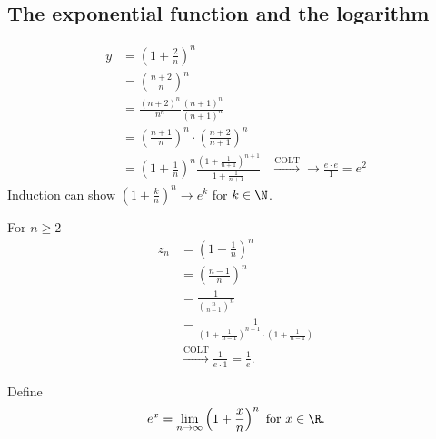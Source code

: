 \documentclass[10pt, a4paper]{article}
\begin{document}
\subsection{The exponential function and the logarithm}
\begin{example}
    \begin{align*}
        y &= \left(1 + \frac{2}{n}\right) ^ n \\
        &= \left(\frac{n + 2}{n}\right) ^ n \\
        &= \frac{(n + 2) ^ n}{n ^ n}\frac{(n + 1) ^ n}{(n + 1) ^ n} \\
        &= \left(\frac{n + 1}{n}\right) ^ n \cdot \left(\frac{n + 2}{n + 1}\right) ^ n \\
        &= \left(1 + \frac{1}{n}\right) ^ n\frac{\left(1 + \frac{1}{n + 1}\right) ^ {n + 1}}{1 + \frac{1}{n + 1}}
        &\xrightarrow{\text{COLT}}\to\frac{e \cdot e}{1} = e ^ 2
    \end{align*}
    Induction can show $\left(1 + \frac{k}{n}\right) ^ n \to e ^ k$ for $k \in \N$.

    For $n \geq 2$
    \begin{align*}
        z_n &= \left(1 - \frac{1}{n}\right) ^ n \\
        &= \left(\frac{n - 1}{n}\right) ^ n \\
        &= \frac{1}{\left(\frac{n}{n - 1}\right) ^ n} \\
        &= \frac{1}{\left(1 + \frac{1}{n - 1}\right) ^ {n - 1}\cdot\left(1 + \frac{1}{n - 1}\right)} \\
        &\xrightarrow{\text{COLT}}\frac{1}{e \cdot 1} = \frac{1}{e}.
    \end{align*}
\end{example}

Define
\[
e ^ x = \lim_{n \to \infty}\left(1 + \frac{x}{n}\right) ^ n\text{ for } x \in \R.
\]
\end{document}
